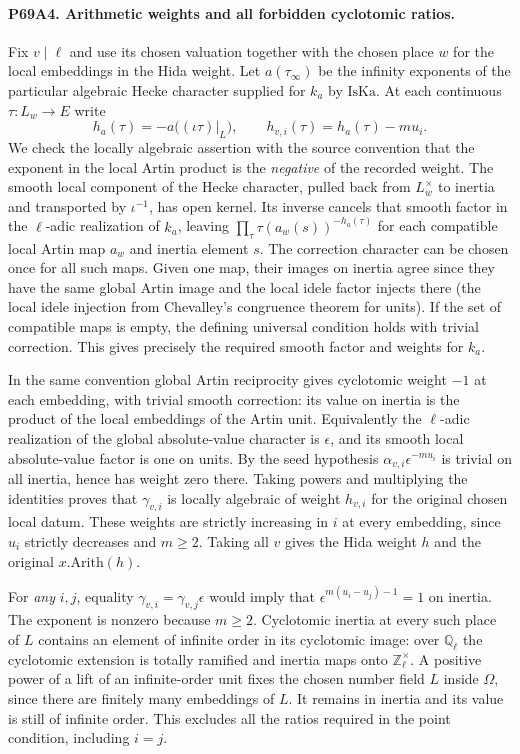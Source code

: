 \paragraph{P69A4. Arithmetic weights and all forbidden cyclotomic ratios.}
Fix $v\mid\ell$ and use its chosen valuation together with the
chosen place $w$ for the local embeddings in the Hida weight.
Let $a(\tau_\infty)$ be the infinity exponents of the particular
algebraic Hecke character supplied for $k_a$ by $\mathrm{IsKa}$.
At each continuous $\tau:L_w\to E$ write
\[
 h_a(\tau)=-a\bigl((\iota\tau)|_L\bigr),\qquad
 h_{v,i}(\tau)=h_a(\tau)-m u_i .
\]
We check the locally algebraic assertion with the source convention
that the exponent in the local Artin product is the \emph{negative}
of the recorded weight. The smooth local component of the Hecke
character, pulled back from $L_w^\times$ to inertia and transported
by $\iota^{-1}$, has open kernel. Its inverse cancels that smooth
factor in the $\ell$-adic realization of $k_a$, leaving
$\prod_\tau\tau(a_w(s))^{-h_a(\tau)}$ for each compatible local
Artin map $a_w$ and inertia element $s$. The correction character
can be chosen once for all such maps. Given one map, their images
on inertia agree since they have the same global Artin image
and the local idele factor injects there (the local idele
injection from Chevalley's congruence theorem for units).
If the set of compatible maps is empty, the defining universal
condition holds with trivial correction. This gives precisely the
required smooth factor and weights for $k_a$.

In the same convention global Artin reciprocity gives cyclotomic
weight $-1$ at each embedding, with trivial smooth correction:
its value on inertia is the product of the local embeddings of the
Artin unit. Equivalently the $\ell$-adic realization of the global
absolute-value character is $\epsilon$, and its smooth local
absolute-value factor is one on units. By the seed hypothesis
$\alpha_{v,i}\epsilon^{-m u_i}$ is trivial on all inertia, hence
has weight zero there. Taking powers and multiplying the
identities proves that $\gamma_{v,i}$ is locally algebraic of
weight $h_{v,i}$ for the original chosen local datum. These
weights are strictly increasing in $i$ at every embedding, since
$u_i$ strictly decreases and $m\ge2$. Taking all $v$ gives the
Hida weight $h$ and the original $x.\mathrm{Arith}(h)$.

For \emph{any} $i,j$, equality
$\gamma_{v,i}=\gamma_{v,j}\epsilon$ would imply that
$\epsilon^{m(u_i-u_j)-1}=1$ on inertia. The exponent is nonzero
because $m\ge2$. Cyclotomic inertia at every such place of $L$
contains an element of infinite order in its cyclotomic image:
over $\mathbb Q_\ell$ the cyclotomic extension is totally ramified
and inertia maps onto $\mathbb Z_\ell^\times$. A positive power
of a lift of an infinite-order unit fixes the chosen number field
$L$ inside $\Omega$, since there are finitely many embeddings of
$L$. It remains in inertia and its value is still of infinite
order. This excludes all the ratios required in the point
condition, including $i=j$.

